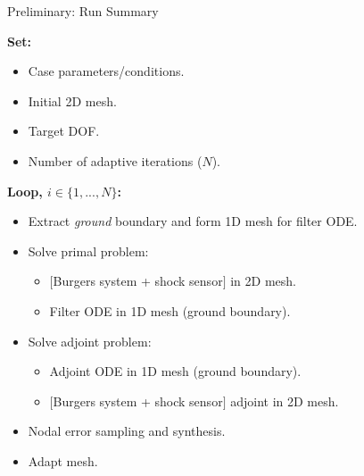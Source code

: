 \documentclass{beamer}
\newcounter{sectionframecount}
\begin{document}

\begin{frame}[t]{Preliminary: Run Summary}

  \begin{enumerate}
  \item \textbf{Set:}
    \begin{itemize}
      \item Case parameters/conditions.
      \item Initial 2D mesh.
      \item Target DOF.
      \item Number of adaptive iterations ($N$).
    \end{itemize}
  {
  \item \textbf{Loop, $i \in \{1,...,N\}$:}
  \begin{itemize}
    \item Extract \textit{ground} boundary and form 1D mesh for filter ODE.
    \item Solve primal problem:
    \begin{itemize}
      \item $[$Burgers system + shock sensor$]$ in 2D mesh.
      \item Filter ODE in 1D mesh (ground boundary).
    \end{itemize}
    \item Solve adjoint problem:
    \begin{itemize}
      \item Adjoint ODE in 1D mesh (ground boundary).
      \item $[$Burgers system + shock sensor$]$ adjoint in 2D mesh.
    \end{itemize}
    \item Nodal error sampling and synthesis.
    \item Adapt mesh.
  \end{itemize}
  }
\end{enumerate}


\end{frame}

\end{document}
